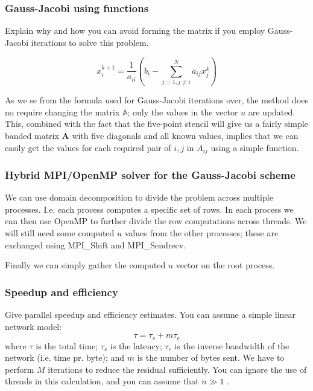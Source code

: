 \subsubsection{Gauss-Jacobi using functions} %
\label{ssub:gauss_jacobi_using_functions}

\begin{question}
  Explain why and how you can avoid forming the matrix if you employ Gauss-Jacobi iterations to solve this problem.
\end{question}

\begin{equation}
  x_i^{k+1} = \frac{1}{a_{ii}} \left( b_i - \sum_{j=1, j\neq i}^N a_{ij} x_j^k \right) \label{eq:gauss_seidel}
\end{equation}

As we se from the formula used for Gauss-Jacobi iterations over, the method does no require changing the matrix $\mathbb{A}$; only the values in the vector $u$ are updated. This, combined with the fact that the five-point stencil will give us a fairly simple banded matrix $\mathbf{A}$ with five diagonals and all known values, implies that we can easily get the values for each required pair of $i,j$ in $A_{ij}$ using a simple function.

\subsubsection{Hybrid MPI/OpenMP solver for the Gauss-Jacobi scheme} %
\label{ssub:hybrid_mpi_openmp_solver_for_the_gauss_jacobi_scheme}
We can use domain decomposition to divide the problem across multiple processes. I.e. each process computes a specific set of rows. In each process we can then use OpenMP to further divide the row computations across threads. We will still need some computed $u$ values from the other processes; these are exchanged using MPI\_Shift and MPI\_Sendrecv.

Finally we can simply gather the computed $u$ vector on the root process.

\subsubsection{Speedup and efficiency} %
\label{ssub:speedup_and_efficiency}

\begin{question}
  Give parallel speedup and efficiency estimates. You can assume a simple linear network model:
  \begin{equation}
    \nonumber
    \tau = \tau_s + m\tau_c
  \end{equation}
  where $\tau$ is the total time; $\tau_s$ is the latency; $\tau_c$ is the inverse bandwidth of the network (i.e. time pr. byte); and $m$ is the number of bytes sent. We have to perform $M$ iterations to reduce the residual sufficiently. You can ignore the use of threads in this calculation, and you can assume that $n \gg 1$ .
\end{question}

